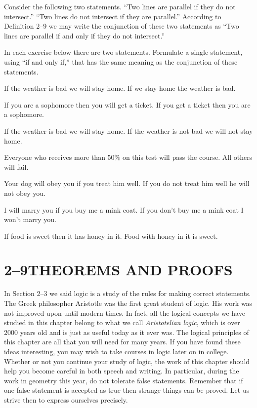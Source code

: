 \documentclass[11pt]{book}
\begin{document}
Consider the following two statements. ``Two lines are parallel if they do not
intersect.'' ``Two lines do not intersect if they are parallel.'' According to
Definition 2--9 we may write the conjunction of these two statements as ``Two
lines are parallel if and only if they do not intersect.''


In each exercise below there are two statements. Formulate a single statement,
using ``if and only if,'' that has the same meaning as the conjunction of these
statements.

\begin{exercisecols}
\begin{exlist}
\item If the weather is bad we will stay home. If we stay home the weather is bad.
\item If you are a sophomore then you will get a ticket. If you get a ticket then
      you are a sophomore.
\item If the weather is bad we will stay home. If the weather is not bad we will
      not stay home.
\item Everyone who receives more than 50\% on this test will pass the course. All
      others will fail.
\item Your dog will obey you if you treat him well. If you do not treat him well
      he will not obey you.
\item I will marry you if you buy me a mink coat. If you don't buy me a mink coat
      I won't marry you.
\item If food is sweet then it has honey in it. Food with honey in it is sweet.
\end{exlist}
\end{exercisecols}

\section*{2--9\quad THEOREMS AND PROOFS}

In Section 2--3 we said logic is a study of the rules for making correct
statements. The Greek philosopher Aristotle was the first great student of logic.
His work was not improved upon until modern times. In fact, all the logical
concepts we have studied in this chapter belong to what we call
\emph{Aristotelian logic}, which is over 2000 years old and is just as useful
today as it ever was. The logical principles of this chapter are all that you will
need for many years. If you have found these ideas interesting, you may wish to
take courses in logic later on in college. Whether or not you continue your study
of logic, the work of this chapter should help you become careful in both speech
and writing. In particular, during the work in geometry this year, do not tolerate
false statements. Remember that if one false statement is accepted as true then
strange things can be proved. Let us strive then to express ourselves precisely.
\end{document}
